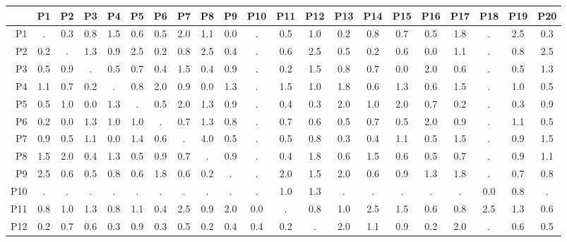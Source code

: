 \documentclass [12pt]{report}
\begin{document}
    \begin{landscape}
    \begin{table}[p]
            \label{tab:setup1}
            \centering
            \setlength{\tabcolsep}{5pt}
            \begin{tabular}{r|cccccccccccccccccccc}
                &       P1  & P2  & P3  & P4  & P5  & P6  &  P7 &   P8  &	P9	&	P10	&	P11	&	P12	&	P13	&	P14	&	P15	&	P16	&	P17	&	P18	&	P19	&	P20  \\ \hline
                P1	&	 .  & 0.3 & 0.8 & 1.5 & 0.6 & 0.5 & 2.0 & 1.1 & 0.0 &  .  & 0.5 & 1.0 & 0.2 & 0.8 & 0.7 & 0.5 & 1.8 &  .  & 2.5 & 0.3	\\
                P2	&	0.2 &  .  & 1.3 & 0.9 & 2.5 & 0.2 & 0.8 & 2.5 & 0.4 &  .  & 0.6 & 2.5 & 0.5 & 0.2 & 0.6 & 0.0 & 1.1 &  .  & 0.8 & 2.5	\\
                P3	&	0.5 & 0.9 &  .  & 0.5 & 0.7 & 0.4 & 1.5 & 0.4 & 0.9 &  .  & 0.2 & 1.5 & 0.8 & 0.7 & 0.0 & 2.0 & 0.6 &  .  & 0.5 & 1.3	\\
                P4	&	1.1 & 0.7 & 0.2 &  .  & 0.8 & 2.0 & 0.9 & 0.0 & 1.3 &  .  & 1.5 & 1.0 & 1.8 & 0.6 & 1.3 & 0.6 & 1.5 &  .  & 1.0 & 0.5	\\
                P5	&	0.5 & 1.0 & 0.0 & 1.3 &  .  & 0.5 & 2.0 & 1.3 & 0.9 &  .  & 0.4 & 0.3 & 2.0 & 1.0 & 2.0 & 0.7 & 0.2 &  .  & 0.3 & 0.9	\\
                P6	&	0.2 & 0.0 & 1.3 & 1.0 & 1.0 &  .  & 0.7 & 1.3 & 0.8 &  .  & 0.7 & 0.6 & 0.5 & 0.7 & 0.5 & 2.0 & 0.9 &  .  & 1.1 & 0.5	\\
                P7	&	0.9 & 0.5 & 1.1 & 0.0 & 1.4 & 0.6 &  .  & 4.0 & 0.5 &  .  & 0.5 & 0.8 & 0.3 & 0.4 & 1.1 & 0.5 & 1.5 &  .  & 0.9 & 1.5	\\
                P8	&	1.5 & 2.0 & 0.4 & 1.3 & 0.5 & 0.9 & 0.7 &  .  & 0.9 &  .  & 0.4 & 1.8 & 0.6 & 1.5 & 0.6 & 0.5 & 0.7 &  .  & 0.9 & 1.1	\\
                P9	&	2.5 & 0.6 & 0.5 & 0.8 & 0.6 & 1.8 & 0.6 & 0.2 &  .  &  .  & 2.0 & 1.5 & 2.0 & 0.6 & 0.9 & 1.3 & 1.8 &  .  & 0.7 & 0.8	\\
                P10	&	 .  &  .  &  .  &  .  &  .  &  .  &  .  &  .  &  .  &  .  & 1.0 & 1.3 &  .  &  .  &  .  &  .  &  .  & 0.0 & 0.8 &  . 	\\
                P11	&	0.8 & 1.0 & 1.3 & 0.8 & 1.1 & 0.4 & 2.5 & 0.9 & 2.0 & 0.0 &  .  & 0.8 & 1.0 & 2.5 & 1.5 & 0.6 & 0.8 & 2.5 & 1.3 & 0.6	\\
                P12	&	0.2 & 0.7 & 0.6 & 0.3 & 0.9 & 0.3 & 0.5 & 0.2 & 0.4 & 0.4 & 0.2 &  .  & 2.0 & 1.1 & 0.9 & 0.2 & 2.0 &  .  & 0.6 & 0.5	\\

\end{tabular}
\end{table}
\end{landscape}
\end{document}
